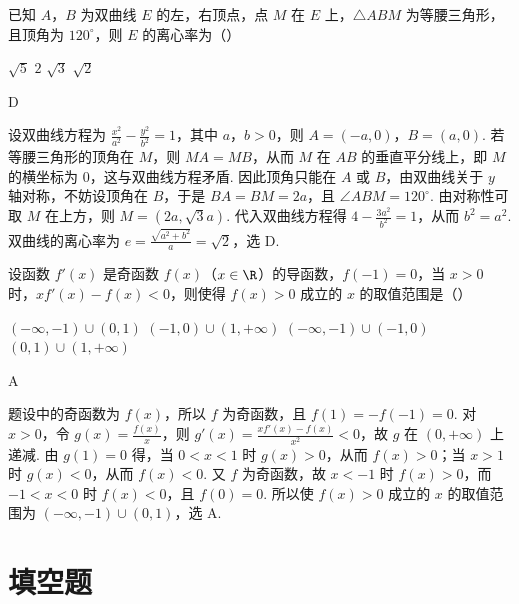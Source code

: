\begin{problem}
已知 \(A\)，\(B\) 为双曲线 \(E\) 的左，右顶点，点 \(M\) 在 \(E\) 上，\(\triangle ABM\) 为等腰三角形，且顶角为 \(120^\circ\)，则 \(E\) 的离心率为（\quad）

\choices
    {\(\sqrt{5}\)}
    {\(2\)}
    {\(\sqrt{3}\)}
    {\(\sqrt{2}\)}
\end{problem}

\begin{answer}
D
\end{answer}

\begin{solution}
设双曲线方程为 \(\frac{x^2}{a^2}-\frac{y^2}{b^2}=1\)，其中 \(a\)，\(b>0\)，则 \(A=(-a,0)\)，\(B=(a,0)\). 若等腰三角形的顶角在 \(M\)，则 \(MA=MB\)，从而 \(M\) 在 \(AB\) 的垂直平分线上，即 \(M\) 的横坐标为 \(0\)，这与双曲线方程矛盾. 因此顶角只能在 \(A\) 或 \(B\)，由双曲线关于 \(y\) 轴对称，不妨设顶角在 \(B\)，于是 \(BA=BM=2a\)，且 \(\angle ABM=120^\circ\). 由对称性可取 \(M\) 在上方，则 \(M=(2a,\sqrt3a)\). 代入双曲线方程得 \(4-\frac{3a^2}{b^2}=1\)，从而 \(b^2=a^2\). 双曲线的离心率为 \(e=\frac{\sqrt{a^2+b^2}}{a}=\sqrt2\)，选 D.
\end{solution}

\begin{problem}
设函数 \(f'(x)\) 是奇函数 \(f(x)\)（\(x\in\R\)）的导函数，\(f(-1)=0\)，当 \(x>0\) 时，\(xf'(x)-f(x)<0\)，则使得 \(f(x)>0\) 成立的 \(x\) 的取值范围是（\quad）

\choices
    {\((-\infty,-1)\cup(0,1)\)}
    {\((-1,0)\cup(1,+\infty)\)}
    {\((-\infty,-1)\cup(-1,0)\)}
    {\((0,1)\cup(1,+\infty)\)}
\end{problem}

\begin{answer}
A
\end{answer}

\begin{solution}
题设中的奇函数为 \(f(x)\)，所以 \(f\) 为奇函数，且 \(f(1)=-f(-1)=0\). 对 \(x>0\)，令 \(g(x)=\frac{f(x)}{x}\)，则
\(g'(x)=\frac{xf'(x)-f(x)}{x^2}<0\)，故 \(g\) 在 \((0,+\infty)\) 上递减. 由 \(g(1)=0\) 得，当 \(0<x<1\) 时 \(g(x)>0\)，从而 \(f(x)>0\)；当 \(x>1\) 时 \(g(x)<0\)，从而 \(f(x)<0\). 又 \(f\) 为奇函数，故 \(x<-1\) 时 \(f(x)>0\)，而 \(-1<x<0\) 时 \(f(x)<0\)，且 \(f(0)=0\). 所以使 \(f(x)>0\) 成立的 \(x\) 的取值范围为 \(\left(-\infty,-1\right)\cup\left(0,1\right)\)，选 A.
\end{solution}

\section{填空题}

